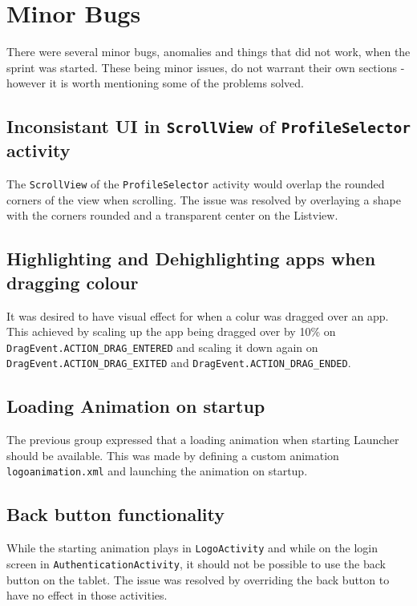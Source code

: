 \section{Minor Bugs}

There were several minor bugs, anomalies and things that did not work, when the sprint was started.
These being minor issues, do not warrant their own sections - however it is worth mentioning some of the problems solved.

\subsection*{Inconsistant UI in \lstinline{ScrollView} of \lstinline{ProfileSelector} activity}

The \lstinline{ScrollView} of the \lstinline{ProfileSelector} activity would overlap the rounded corners of the view when scrolling.
The issue was resolved by overlaying a shape with the corners rounded and a transparent center on the Listview.

\subsection*{Highlighting and Dehighlighting apps when dragging colour}

It was desired to have visual effect for when a colur was dragged over an app.
This achieved by scaling up the app being dragged over by 10\% on \lstinline{DragEvent.ACTION_DRAG_ENTERED} and scaling it down again on \lstinline{DragEvent.ACTION_DRAG_EXITED} and \lstinline{DragEvent.ACTION_DRAG_ENDED}.

\subsection*{Loading Animation on startup}

The previous group expressed that a loading animation when starting Launcher should be available.
This was made by defining a custom animation \lstinline{logoanimation.xml} and launching the animation on startup.

\subsection*{Back button functionality}

While the starting animation plays in \lstinline{LogoActivity} and while on the login screen in \lstinline{AuthenticationActivity}, it should not be possible to use the back button on the tablet.
The issue was resolved by overriding the back button to have no effect in those activities.

